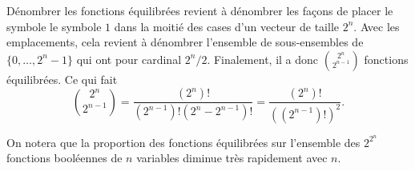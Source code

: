 \begin{rem}
  Dénombrer les fonctions équilibrées revient à dénombrer les façons
  de placer le symbole le symbole $1$ dans la moitié des cases d'un
  vecteur de taille $2^n$. Avec les emplacements, cela revient à
  dénombrer l'ensemble de sous-ensembles de $\{0, \dots, 2^{n}-1 \}$
  qui ont pour cardinal $2^n / 2$. Finalement, il a donc
  ${\displaystyle {2^n \choose 2^{n-1}}}$ fonctions équilibrées. Ce qui fait
  \[ {\displaystyle {2^n \choose 2^{n-1}}} = \frac{(2^n)!}{(2^{n-1})!(2^n-2^{n-1})!} = \frac{(2^n)!}{((2^{n-1})!)^2}.  \]

  On notera que la proportion des fonctions équilibrées sur l'ensemble
  des $2^{2^n}$ fonctions booléennes de $n$ variables diminue très
  rapidement avec $n$.
\end{rem}






